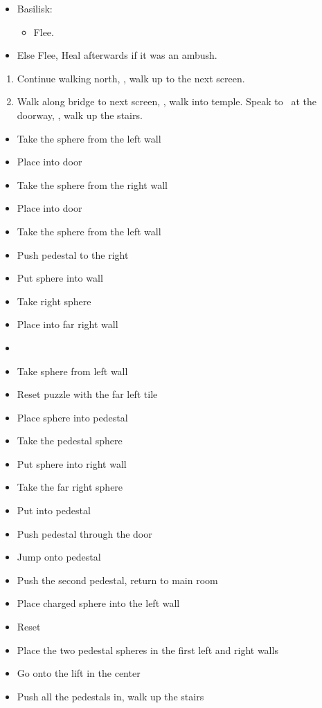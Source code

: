 \begin{encounters}
	\begin{itemize}
		\item Basilisk:
		\begin{itemize}
			\kimahrif Lancet Basilisk, learn \textbf{Stone Breath}
			\item Flee.
		\end{itemize}
		\item Else Flee,  Heal afterwards if it was an ambush.
	\end{itemize}
\end{encounters}
\begin{enumerate}[resume]
	\item Continue walking north, \sd, walk up to the next screen.
	\item Walk along bridge to next screen, \sd, walk into temple. Speak to \auron\ at the doorway, \sd, walk up the stairs.
\end{enumerate}
\vfill
\begin{trial}
\begin{itemize}
	\item Take the sphere from the left wall
	\item Place into door
	\item Take the sphere from the right wall
	\item Place into door
	\item Take the sphere from the left wall
	\item Push pedestal to the right
	\item Put sphere into wall
	\item Take right sphere
	\item Place into far right wall
	\item \cs
	\item Take sphere from left wall
	\item Reset puzzle with the far left tile
	\item Place sphere into pedestal
	\item Take the pedestal sphere
	\item Put sphere into right wall
	\item Take the far right sphere
	\item Put into pedestal
	\item Push pedestal through the door
	\item Jump onto pedestal
	\item Push the second pedestal, return to main room
	\item Place charged sphere into the left wall
	\item Reset
	\item Place the two pedestal spheres in the first left and right walls
	\item Go onto the lift in the center
	\item Push all the pedestals in, walk up the stairs
\end{itemize}
\end{trial}
